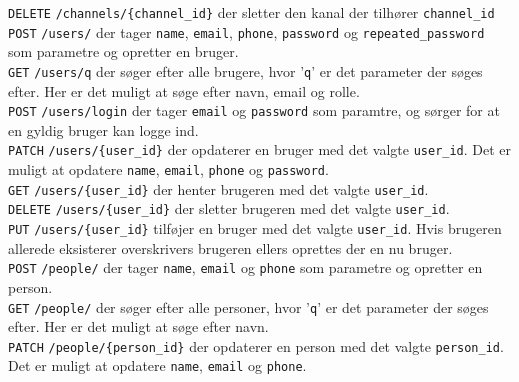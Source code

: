\texttt{DELETE} \texttt{/channels/\{channel\_id\}} der sletter den kanal der tilhører \texttt{channel\_id}\\


\texttt{POST} \texttt{/users/} der tager \texttt{name}, \texttt{email}, \texttt{phone}, \texttt{password} og \texttt{repeated\_password} som parametre og opretter en bruger.\\


\texttt{GET} \texttt{/users/q} der søger efter alle brugere, hvor '\texttt{q}' er det parameter der søges efter. Her er det muligt at søge efter navn, email og rolle.\\


\texttt{POST} \texttt{/users/login} der tager \texttt{email} og \texttt{password} som paramtre, og sørger for at en gyldig bruger kan logge ind.\\


\texttt{PATCH} \texttt{/users/\{user\_id\}} der opdaterer en bruger med det valgte \texttt{user\_id}. Det er muligt at opdatere \texttt{name}, \texttt{email}, \texttt{phone} og \texttt{password}.\\


\texttt{GET} \texttt{/users/\{user\_id\}} der henter brugeren med det valgte \texttt{user\_id}.\\


\texttt{DELETE} \texttt{/users/\{user\_id\}} der sletter brugeren med det valgte \texttt{user\_id}.\\


\texttt{PUT} \texttt{/users/\{user\_id\}} tilføjer en bruger med det valgte \texttt{user\_id}. Hvis brugeren allerede eksisterer overskrivers brugeren ellers oprettes der en nu bruger.\\

\texttt{POST} \texttt{/people/} der tager \texttt{name}, \texttt{email} og \texttt{phone} som parametre og opretter en person.\\


\texttt{GET} \texttt{/people/} der søger efter alle personer, hvor '\texttt{q}' er det parameter der søges efter. Her er det muligt at søge efter navn.\\


\texttt{PATCH} \texttt{/people/\{person\_id\}} der opdaterer en person med det valgte \texttt{person\_id}. Det er muligt at opdatere \texttt{name}, \texttt{email} og \texttt{phone}.\\


